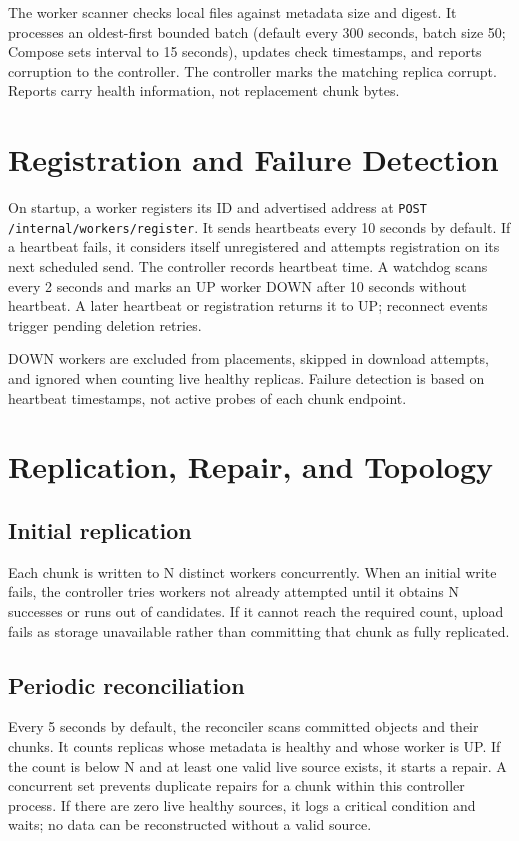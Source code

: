 \documentclass[11pt,a4paper]{article}
\begin{document}
The worker scanner checks local files against metadata size and digest. It processes an oldest-first bounded batch (default every 300 seconds, batch size 50; Compose sets interval to 15 seconds), updates check timestamps, and reports corruption to the controller. The controller marks the matching replica corrupt. Reports carry health information, not replacement chunk bytes.

\section{Registration and Failure Detection}
On startup, a worker registers its ID and advertised address at \texttt{POST /internal/workers/register}. It sends heartbeats every 10 seconds by default. If a heartbeat fails, it considers itself unregistered and attempts registration on its next scheduled send. The controller records heartbeat time. A watchdog scans every 2 seconds and marks an UP worker DOWN after 10 seconds without heartbeat. A later heartbeat or registration returns it to UP; reconnect events trigger pending deletion retries.

DOWN workers are excluded from placements, skipped in download attempts, and ignored when counting live healthy replicas. Failure detection is based on heartbeat timestamps, not active probes of each chunk endpoint.

\section{Replication, Repair, and Topology}
\subsection{Initial replication}
Each chunk is written to N distinct workers concurrently. When an initial write fails, the controller tries workers not already attempted until it obtains N successes or runs out of candidates. If it cannot reach the required count, upload fails as storage unavailable rather than committing that chunk as fully replicated.
\subsection{Periodic reconciliation}
Every 5 seconds by default, the reconciler scans committed objects and their chunks. It counts replicas whose metadata is healthy and whose worker is UP. If the count is below N and at least one valid live source exists, it starts a repair. A concurrent set prevents duplicate repairs for a chunk within this controller process. If there are zero live healthy sources, it logs a critical condition and waits; no data can be reconstructed without a valid source.
\end{document}
